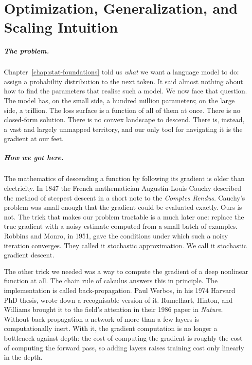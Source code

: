 \chapter{Optimization, Generalization, and Scaling Intuition}
\label{chap:optimization}
\label{sec:ch2-optgen}

\scenelabel
\begin{scenestrip}
\end{scenestrip}

\paragraph{The problem.} Chapter~\ref{chap:stat-foundations} told us \emph{what} we want a
language model to do: assign a probability distribution to the next
token. It said almost nothing about how to find the parameters that
realise such a model. We now face that question. The model has, on
the small side, a hundred million parameters; on the large side, a
trillion. The loss surface is a function of all of them at once.
There is no closed-form solution. There is no convex landscape to
descend. There is, instead, a vast and largely unmapped territory,
and our only tool for navigating it is the gradient at our feet.

\paragraph{How we got here.} The mathematics of descending a
function by following its gradient is older than electricity. In
1847 the French mathematician Augustin-Louis Cauchy described the
method of steepest descent in a short note to the
\emph{Comptes Rendus}. Cauchy's problem was small enough that the
gradient could be evaluated exactly. Ours is not. The trick that
makes our problem tractable is a much later one: replace the true
gradient with a noisy estimate computed from a small batch of
examples. Robbins and Monro, in 1951, gave the conditions under
which such a noisy iteration converges. They called it stochastic
approximation. We call it stochastic gradient descent.

The other trick we needed was a way to compute the gradient of a
deep nonlinear function at all. The chain rule of calculus answers
this in principle. The implementation is called
back-propagation. Paul Werbos, in his 1974 Harvard PhD thesis,
wrote down a recognisable version of it. Rumelhart, Hinton, and
Williams brought it to the field's attention in their 1986 paper
in \emph{Nature}. Without back-propagation a network of more than
a few layers is computationally inert. With it, the gradient
computation is no longer a bottleneck against depth: the cost of
computing the gradient is roughly the cost of computing the forward
pass, so adding layers raises training cost only linearly in the
depth.

